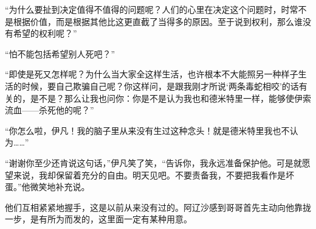 \par “为什么要扯到决定值得不值得的问题呢？人们的心里在决定这个问题时，时常不是根据价值，而是根据其他比这更直截了当得多的原因。至于说到权利，那么谁没有希望的权利呢？”
\par “怕不能包括希望别人死吧？”
\par “即使是死又怎样呢？为什么当大家全这样生活，也许根本不大能照另一种样子生活的时候，要自己欺骗自己呢？你这样问，是跟我刚才所说‘两条毒蛇相咬’的话有关的，是不是？那么让我也问你：你是不是认为我也和德米特里一样，能够使伊索流血——杀死他的呢？”
\par “你怎么啦，伊凡！我的脑子里从来没有生过这种念头！就是德米特里我也不认为……”
\par “谢谢你至少还肯说这句话，”伊凡笑了笑，“告诉你，我永远准备保护他。可是就愿望来说，我却保留着充分的自由。明天见吧。不要责备我，不要把我看作是坏蛋。”他微笑地补充说。
\par 他们互相紧紧地握手，这是以前从来没有过的。阿辽沙感到哥哥首先主动向他靠拢一步，是有所为而发的，这里面一定有某种用意。
